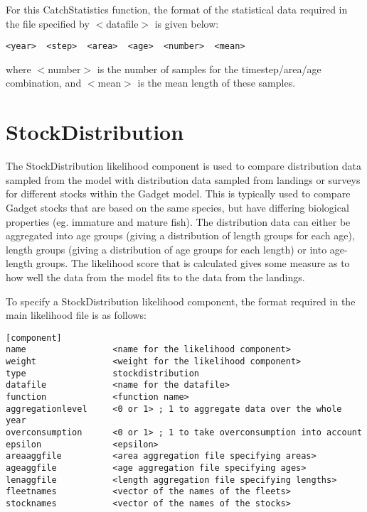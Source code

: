 \documentclass[]{book}
\begin{document}
For this CatchStatistics function, the format of the statistical data
required in the file specified by \(<\)datafile\(>\) is given below:

\begin{verbatim}
<year>  <step>  <area>  <age>  <number>  <mean>
\end{verbatim}

where \(<\)number\(>\) is the number of samples for the timestep/area/age
combination, and \(<\)mean\(>\) is the mean length of these samples.

\hypertarget{sec:stockdist}{%
\section{StockDistribution}\label{sec:stockdist}}

The StockDistribution likelihood component is used to compare
distribution data sampled from the model with distribution data sampled
from landings or surveys for different stocks within the Gadget model.
This is typically used to compare Gadget stocks that are based on the
same species, but have differing biological properties (eg. immature and
mature fish). The distribution data can either be aggregated into age
groups (giving a distribution of length groups for each age), length
groups (giving a distribution of age groups for each length) or into
age-length groups. The likelihood score that is calculated gives some
measure as to how well the data from the model fits to the data from the
landings.

To specify a StockDistribution likelihood component, the format required
in the main likelihood file is as follows:

\begin{verbatim}
[component]
name                 <name for the likelihood component>
weight               <weight for the likelihood component>
type                 stockdistribution
datafile             <name for the datafile>
function             <function name>
aggregationlevel     <0 or 1> ; 1 to aggregate data over the whole year
overconsumption      <0 or 1> ; 1 to take overconsumption into account
epsilon              <epsilon>
areaaggfile          <area aggregation file specifying areas>
ageaggfile           <age aggregation file specifying ages>
lenaggfile           <length aggregation file specifying lengths>
fleetnames           <vector of the names of the fleets>
stocknames           <vector of the names of the stocks>
\end{verbatim}
\end{document}

